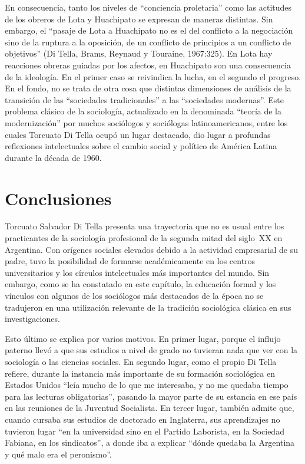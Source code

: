 En consecuencia, tanto los niveles de ``conciencia proletaria'' como las actitudes de los obreros de Lota y Huachipato se expresan de maneras distintas. Sin embargo, el ``pasaje de Lota a Huachipato no es el del conflicto a la negociación sino de la ruptura a la oposición, de un conflicto de principios a un conflicto de objetivos'' (Di Tella, Brams, Reynaud y Touraine, 1967:325). En Lota hay reacciones obreras guiadas por los afectos, en Huachipato son una consecuencia de la ideología. En el primer caso se reivindica la lucha, en el segundo el progreso. En el fondo, no se trata de otra cosa que distintas dimensiones de análisis de la transición de las ``sociedades tradicionales'' a las ``sociedades modernas''. Este problema clásico de la sociología, actualizado en la denominada ``teoría de la modernización'' por muchos sociólogos y sociólogas latinoamericanos, entre los cuales Torcuato Di Tella ocupó un lugar destacado, dio lugar a profundas reflexiones intelectuales sobre el cambio social y político de América Latina durante la década de 1960.

\section{Conclusiones}

Torcuato Salvador Di Tella presenta una trayectoria que no es usual entre los practicantes de la sociología profesional de la segunda mitad del siglo~XX en Argentina. Con orígenes sociales elevados debido a la actividad empresarial de su padre, tuvo la posibilidad de formarse académicamente en los centros universitarios y los círculos intelectuales más importantes del mundo. Sin embargo, como se ha constatado en este capítulo, la educación formal y los vínculos con algunos de los sociólogos más destacados de la época no se tradujeron en una utilización relevante de la tradición sociológica clásica en sus investigaciones.

Esto último se explica por varios motivos. En primer lugar, porque el influjo paterno llevó a que sus estudios a nivel de grado no tuvieran nada que ver con la sociología o las ciencias sociales. En segundo lugar, como el propio Di Tella refiere, durante la instancia más importante de su formación sociológica en Estados Unidos ``leía mucho de lo que me interesaba, y no me quedaba tiempo para las lecturas obligatorias'', pasando la mayor parte de su estancia en ese país en las reuniones de la Juventud Socialista. En tercer lugar, también admite que, cuando cursaba sus estudios de doctorado en Inglaterra, sus aprendizajes no tuvieron lugar ``en la universidad sino en el Partido Laborista, en la Sociedad Fabiana, en los sindicatos'', a donde iba a explicar ``dónde quedaba la Argentina y qué malo era el peronismo''.

